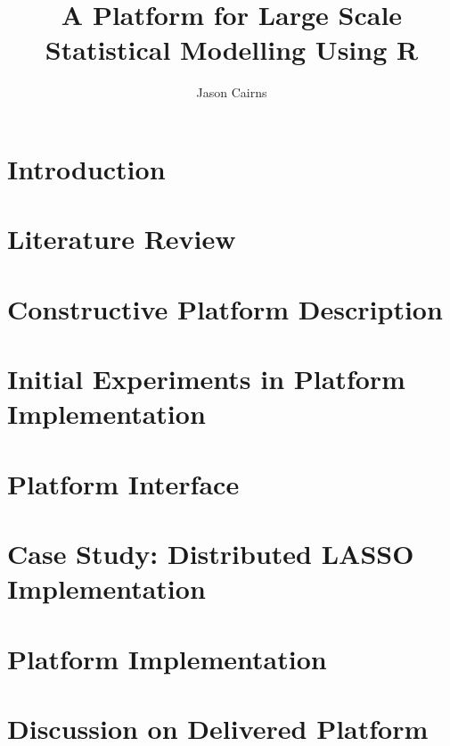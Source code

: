 \documentclass[11pt,a4paper,openright]{aucklandthesis}
\title{A Platform for Large Scale Statistical Modelling Using R}
\author{Jason Cairns}
\begin{document}


\chapter{Introduction}\label{ch:introduction}


\chapter{Literature Review}\label{ch:lit-review}


\chapter{Constructive Platform Description}\label{ch:constructive-description}


\chapter{Initial Experiments in Platform Implementation}\label{ch:initial-experiments}


\chapter{Platform Interface}\label{ch:ui}


\chapter{Case Study: Distributed LASSO Implementation}\label{ch:lasso}


\chapter{Platform Implementation}\label{ch:implementation}


\chapter{Discussion on Delivered Platform}\label{ch:discussion}


\appendix

\printbibliography

\newpage \ \newpage
\end{document}
